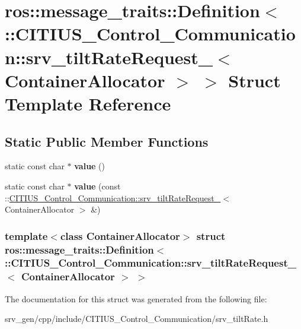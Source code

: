 \hypertarget{structros_1_1message__traits_1_1_definition_3_01_1_1_c_i_t_i_u_s___control___communication_1_1sr5b0c247b786b1965cbd891e7cc76970a}{\section{ros\-:\-:message\-\_\-traits\-:\-:\-Definition$<$ \-:\-:\-C\-I\-T\-I\-U\-S\-\_\-\-Control\-\_\-\-Communication\-:\-:srv\-\_\-tilt\-Rate\-Request\-\_\-$<$ \-Container\-Allocator $>$ $>$ \-Struct \-Template \-Reference}
\label{structros_1_1message__traits_1_1_definition_3_01_1_1_c_i_t_i_u_s___control___communication_1_1sr5b0c247b786b1965cbd891e7cc76970a}
}
\subsection*{\-Static \-Public \-Member \-Functions}
\begin{DoxyCompactItemize}
\item 
\hypertarget{structros_1_1message__traits_1_1_definition_3_01_1_1_c_i_t_i_u_s___control___communication_1_1sr5b0c247b786b1965cbd891e7cc76970a_a0a5f062c22c407c48a117eba6fbd9433}{static const char $\ast$ {\bfseries value} ()}\label{structros_1_1message__traits_1_1_definition_3_01_1_1_c_i_t_i_u_s___control___communication_1_1sr5b0c247b786b1965cbd891e7cc76970a_a0a5f062c22c407c48a117eba6fbd9433}

\item 
\hypertarget{structros_1_1message__traits_1_1_definition_3_01_1_1_c_i_t_i_u_s___control___communication_1_1sr5b0c247b786b1965cbd891e7cc76970a_aefdcb9ac07a95f8347d8be4d8fea778d}{static const char $\ast$ {\bfseries value} (const \-::\hyperlink{struct_c_i_t_i_u_s___control___communication_1_1srv__tilt_rate_request__}{\-C\-I\-T\-I\-U\-S\-\_\-\-Control\-\_\-\-Communication\-::srv\-\_\-tilt\-Rate\-Request\-\_\-}$<$ \-Container\-Allocator $>$ \&)}\label{structros_1_1message__traits_1_1_definition_3_01_1_1_c_i_t_i_u_s___control___communication_1_1sr5b0c247b786b1965cbd891e7cc76970a_aefdcb9ac07a95f8347d8be4d8fea778d}

\end{DoxyCompactItemize}
\subsubsection*{template$<$class Container\-Allocator$>$ struct ros\-::message\-\_\-traits\-::\-Definition$<$ \-::\-C\-I\-T\-I\-U\-S\-\_\-\-Control\-\_\-\-Communication\-::srv\-\_\-tilt\-Rate\-Request\-\_\-$<$ Container\-Allocator $>$ $>$}



\-The documentation for this struct was generated from the following file\-:\begin{DoxyCompactItemize}
\item 
srv\-\_\-gen/cpp/include/\-C\-I\-T\-I\-U\-S\-\_\-\-Control\-\_\-\-Communication/srv\-\_\-tilt\-Rate.\-h\end{DoxyCompactItemize}
